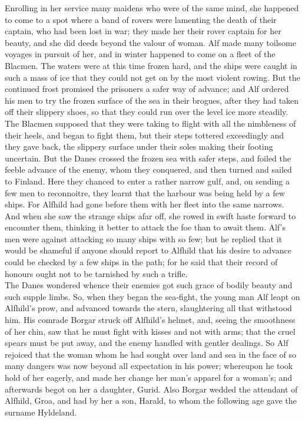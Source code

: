 \documentclass[10pt,a4paper]{report}
\begin{document}
Enrolling in her service many maidens who were of the same mind, she happened to come to a spot where a band of rovers were lamenting the death of their captain, who had been lost in war; they made her their rover captain for her beauty, and she did deeds beyond the valour of woman. Alf made many toilsome voyages in pursuit of her, and in winter happened to come on a fleet of the Blacmen. The waters were at this time frozen hard, and the ships were caught in such a mass of ice that they could not get on by the most violent rowing. But the continued frost promised the prisoners a safer way of advance; and Alf ordered his men to try the frozen surface of the sea in their brogues, after they had taken off their slippery shoes, so that they could run over the level ice more steadily. The Blacmen supposed that they were taking to flight with all the nimbleness of their heels, and began to fight them, but their steps tottered exceedingly and they gave back, the slippery surface under their soles making their footing uncertain. But the Danes crossed the frozen sea with safer steps, and foiled the feeble advance of the enemy, whom they conquered, and then turned and sailed to Finland. Here they chanced to enter a rather narrow gulf, and, on sending a few men to reconnoitre, they learnt that the harbour was being held by a few ships. For Alfhild had gone before them with her fleet into the same narrows. And when she saw the strange ships afar off, she rowed in swift haste forward to encounter them, thinking it better to attack the foe than to await them. Alf's men were against attacking so many ships with so few; but he replied that it would be shameful if anyone should report to Alfhild that his desire to advance could be checked by a few ships in the path; for he said that their record of honours ought not to be tarnished by such a trifle.\\

The Danes wondered whence their enemies got such grace of bodily beauty and such supple limbs. So, when they began the sea-fight, the young man Alf leapt on Alfhild's prow, and advanced towards the stern, slaughtering all that withstood him. His comrade Borgar struck off Alfhild's helmet, and, seeing the smoothness of her chin, saw that he must fight with kisses and not with arms; that the cruel spears must be put away, and the enemy handled with gentler dealings. So Alf rejoiced that the woman whom he had sought over land and sea in the face of so many dangers was now beyond all expectation in his power; whereupon he took hold of her eagerly, and made her change her man's apparel for a woman's; and afterwards begot on her a daughter, Gurid. Also Borgar wedded the attendant of Alfhild, Groa, and had by her a son, Harald, to whom the following age gave the surname Hyldeland.\\
\end{document}

